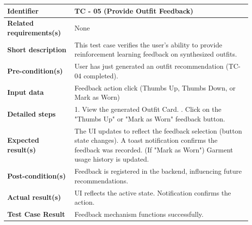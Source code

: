 \documentclass{article}
\begin{document}
\begin{table}[h!]
\centering
\renewcommand{\arraystretch}{1.5}
\begin{tabularx}{\textwidth}{|l|X|}
\hline
\textbf{Identifier} & TC - 05 (Provide Outfit Feedback) \\ \hline
\textbf{Related requirements(s)} & None \\ \hline
\textbf{Short description} & This test case verifies the user's ability to provide reinforcement learning feedback on synthesized outfits. \\ \hline
\textbf{Pre-condition(s)} & User has just generated an outfit recommendation (TC-04 completed). \\ \hline
\textbf{Input data} & Feedback action click (Thumbs Up, Thumbs Down, or Mark as Worn) \\ \hline
\textbf{Detailed steps} & 
1. View the generated Outfit Card. \newline
2. Click on the "Thumbs Up" or "Mark as Worn" feedback button. \\ \hline
\textbf{Expected result(s)} & 
The UI updates to reflect the feedback selection (button state changes). \newline
A toast notification confirms the feedback was recorded. \newline
(If "Mark as Worn") Garment usage history is updated. \\ \hline
\textbf{Post-condition(s)} & Feedback is registered in the backend, influencing future recommendations. \\ \hline
\textbf{Actual result(s)} & 
UI reflects the active state. \newline
Notification confirms the action. \\ \hline
\textbf{Test Case Result} & Feedback mechanism functions successfully. \\ \hline
\end{tabularx}
\end{table}
\end{document}
